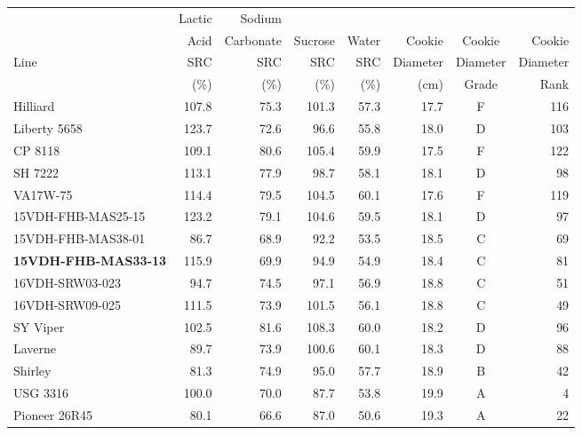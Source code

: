 \documentclass[12pt, letterpaper]{article}
\begin{document}
\begin{landscape}
\begin{table}[ht]
\bigskip

\begin{tabular}{lrrrrrcr}
  \hline
     & Lactic & Sodium    &         &       &          &          &  \\ 
     & Acid   & Carbonate & Sucrose & Water & Cookie   & Cookie   & Cookie \\ 
Line & SRC    & SRC       & SRC     & SRC   & Diameter & Diameter & Diameter \\ 
     & (\%)   & (\%)      & (\%)    & (\%)  & (cm)     & Grade    &  Rank \\ 
  \hline
  Hilliard           & 107.8 & 75.3 & 101.3 & 57.3 & 17.7 & F & 116 \\ 
  Liberty 5658       & 123.7 & 72.6 & 96.6  & 55.8 & 18.0 & D & 103 \\ 
  CP 8118            & 109.1 & 80.6 & 105.4 & 59.9 & 17.5 & F & 122 \\ 
  SH 7222            & 113.1 & 77.9 & 98.7  & 58.1 & 18.1 & D & 98 \\ 
  VA17W-75           & 114.4 & 79.5 & 104.5 & 60.1 & 17.6 & F & 119 \\ 
  15VDH-FHB-MAS25-15 & 123.2 & 79.1 & 104.6 & 59.5 & 18.1 & D & 97 \\ 
  15VDH-FHB-MAS38-01 & 86.7  & 68.9 & 92.2  & 53.5 & 18.5 & C & 69 \\ 
  \textbf{15VDH-FHB-MAS33-13} & 115.9 & 69.9 & 94.9  & 54.9 & 18.4 & C & 81 \\ 
  16VDH-SRW03-023    & 94.7  & 74.5 & 97.1  & 56.9 & 18.8 & C & 51 \\ 
  16VDH-SRW09-025    & 111.5 & 73.9 & 101.5 & 56.1 & 18.8 & C & 49 \\ 
  SY Viper           & 102.5 & 81.6 & 108.3 & 60.0 & 18.2 & D & 96 \\ 
  Laverne            & 89.7  & 73.9 & 100.6 & 60.1 & 18.3 & D & 88 \\ 
  Shirley            & 81.3  & 74.9 & 95.0  & 57.7 & 18.9 & B & 42 \\ 
  USG 3316           & 100.0 & 70.0 & 87.7  & 53.8 & 19.9 & A & 4 \\ 
  Pioneer 26R45      & 80.1  & 66.6 & 87.0  & 50.6 & 19.3 & A & 22 \\ 
   \hline
\end{tabular}
\end{table}


\end{landscape}
\end{document}
